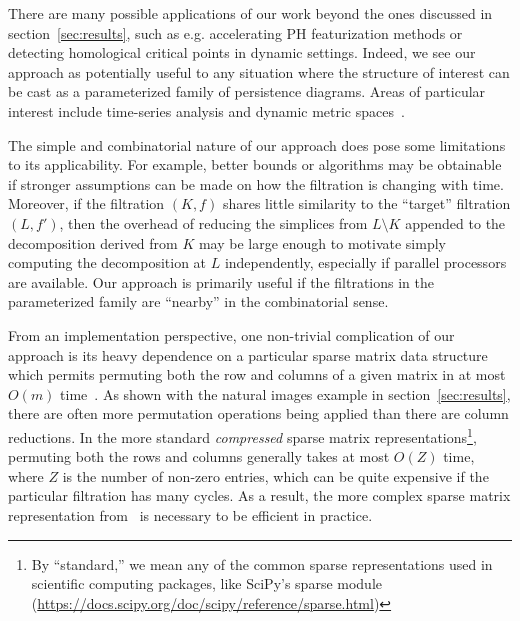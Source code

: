 \documentclass[sn-mathphys]{sn-jnl}
\begin{document}
There are many possible applications of our work beyond the ones discussed in section~\ref{sec:results}, such as e.g. accelerating PH featurization methods or detecting homological critical points in dynamic settings.
Indeed, we see our approach as potentially useful to any situation where the structure of interest can be cast as a parameterized family of persistence diagrams. Areas of particular interest include time-series analysis and dynamic metric spaces~\cite{kim2020spatiotemporal}. 

The simple and combinatorial nature of our approach does pose some limitations to its applicability. For example, better bounds or algorithms may be obtainable if stronger assumptions can be made on how the filtration is changing with time. Moreover, if the filtration $(K, f)$ shares little similarity to the ``target'' filtration $(L,f')$, then the overhead of reducing the simplices from $L \setminus K$ appended to the decomposition derived from $K$ may be large enough to motivate simply computing the decomposition at $L$ independently, especially if parallel processors are available. 
Our approach is primarily useful if the filtrations in the parameterized family are ``nearby'' in the combinatorial sense. 

From an implementation perspective, one non-trivial complication of our approach is its heavy dependence on a particular sparse matrix data structure which permits permuting both the row and columns of a given matrix in at most $O(m)$ time~\cite{cohen2006vines}. As shown with the natural images example in section~\ref{sec:results}, there are often more permutation operations being applied than there are column reductions. In the more standard \emph{compressed} sparse matrix representations\footnote{
By ``standard,'' we mean any of the common sparse representations used in scientific computing packages, like SciPy's sparse module (\url{https://docs.scipy.org/doc/scipy/reference/sparse.html})
}, permuting both the rows and columns generally takes at most $O(Z)$ time, where $Z$ is the number of non-zero entries, which can be quite expensive if the particular filtration has many cycles. As a result, the more complex sparse matrix representation from~\cite{cohen2006vines} is necessary to be efficient in practice. 
\end{document}
